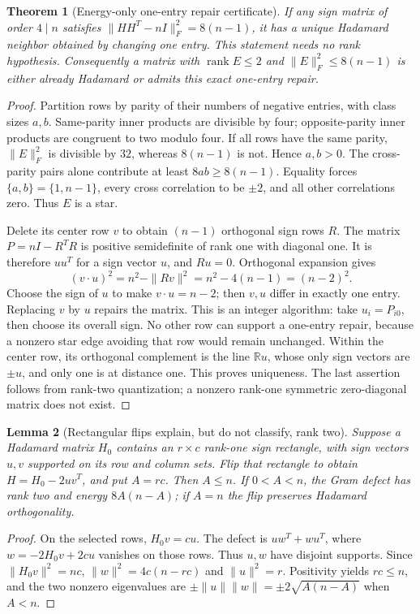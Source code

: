 \documentclass[11pt]{article}
\newtheorem{theorem}{Theorem}[section]
\newtheorem{lemma}[theorem]{Lemma}
\begin{document}
\begin{theorem}[Energy-only one-entry repair certificate]
\label{thm:spectral-one-entry}
If any sign matrix of order $4\mid n$ satisfies
$\|HH^T-nI\|_F^2=8(n-1)$, it has a unique Hadamard neighbor obtained
by changing one entry. This statement needs no rank hypothesis.
Consequently a matrix with $\operatorname{rank}E\le2$ and
$\|E\|_F^2\le8(n-1)$ is either already Hadamard or admits this exact
one-entry repair.
\end{theorem}
\begin{proof}
Partition rows by parity of their numbers of negative entries, with
class sizes $a,b$. Same-parity inner products are divisible by four;
opposite-parity inner products are congruent to two modulo four.
If all rows have the same parity, $\|E\|_F^2$ is divisible by $32$,
whereas $8(n-1)$ is not. Hence $a,b>0$. The cross-parity pairs alone
contribute at least $8ab\ge8(n-1)$. Equality forces
$\{a,b\}=\{1,n-1\}$, every cross correlation to be $\pm2$, and all
other correlations zero. Thus $E$ is a star.

Delete its center row $v$ to obtain $(n-1)$ orthogonal sign rows $R$.
The matrix $P=nI-R^TR$ is positive semidefinite of rank one with diagonal
one. It is therefore $uu^T$ for a sign vector $u$, and $Ru=0$.
Orthogonal expansion gives
\[
 (v\cdot u)^2=n^2-\|Rv\|^2=n^2-4(n-1)=(n-2)^2.
\]
Choose the sign of $u$ to make $v\cdot u=n-2$; then $v,u$ differ in
exactly one entry. Replacing $v$ by $u$ repairs the matrix. This is
an integer algorithm: take $u_i=P_{i0}$, then choose its overall sign.
No other row can support a one-entry repair, because a nonzero star
edge avoiding that row would remain unchanged. Within the center row,
its orthogonal complement is the line $\mathbb Ru$, whose only sign
vectors are $\pm u$, and only one is at distance one. This proves
uniqueness. The last assertion follows from rank-two quantization;
a nonzero rank-one symmetric zero-diagonal matrix does not exist.
\end{proof}

\begin{lemma}[Rectangular flips explain, but do not classify, rank two]
\label{lem:spectral-rectangle}
Suppose a Hadamard matrix $H_0$ contains an $r\times c$ rank-one sign
rectangle, with sign vectors $u,v$ supported on its row and column sets.
Flip that rectangle to obtain $H=H_0-2uv^T$, and put $A=rc$.
Then $A\le n$. If $0<A<n$, the Gram defect has rank two and energy
$8A(n-A)$; if $A=n$ the flip preserves Hadamard orthogonality.
\end{lemma}
\begin{proof}
On the selected rows, $H_0v=cu$. The defect is
$uw^T+wu^T$, where $w=-2H_0v+2cu$ vanishes on those rows.
Thus $u,w$ have disjoint supports. Since $\|H_0v\|^2=nc$,
$\|w\|^2=4c(n-rc)$ and $\|u\|^2=r$. Positivity yields $rc\le n$,
and the two nonzero eigenvalues are
$\pm\|u\|\|w\|=\pm2\sqrt{A(n-A)}$ when $A<n$.
\end{proof}
\end{document}
